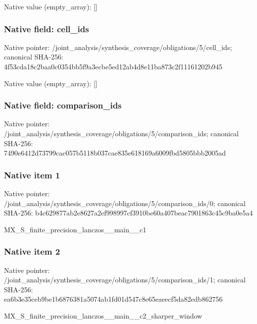 \documentclass[10pt,a4paper]{article}
\begin{document}
Native value (empty\_\allowbreak{}array): []

\subsubsection{Native field: cell\_\allowbreak{}ids}
Native pointer: /joint\_\allowbreak{}analysis/synthesis\_\allowbreak{}coverage/obligations/5/cell\_\allowbreak{}ids; canonical SHA-256: 4f53cda18c2baa0c0354bb5f9a3ecbe5ed12ab4d8e11ba873c2f11161202b945

Native value (empty\_\allowbreak{}array): []

\subsubsection{Native field: comparison\_\allowbreak{}ids}
Native pointer: /joint\_\allowbreak{}analysis/synthesis\_\allowbreak{}coverage/obligations/5/comparison\_\allowbreak{}ids; canonical SHA-256: 7490e6412d73799cac057b5118b037cae835e618169a6009fbd5805bbb2005ad

\subsubsection{Native item 1}
Native pointer: /joint\_\allowbreak{}analysis/synthesis\_\allowbreak{}coverage/obligations/5/comparison\_\allowbreak{}ids/0; canonical SHA-256: b4c629877ab2e8627a2ef998997cf3910be60a407beac7901863c45c9ba0e5a4

\begingroup\raggedright\sloppy MX\_\allowbreak{}S\_\allowbreak{}finite\_\allowbreak{}precision\_\allowbreak{}lanczos\_\allowbreak{}\_\allowbreak{}main\_\allowbreak{}\_\allowbreak{}c1\par\endgroup

\subsubsection{Native item 2}
Native pointer: /joint\_\allowbreak{}analysis/synthesis\_\allowbreak{}coverage/obligations/5/comparison\_\allowbreak{}ids/1; canonical SHA-256: ea6b3e35ceb9be1b6876381a5074ab1fd01d547c8e65eaeecf5da82edb862756

\begingroup\raggedright\sloppy MX\_\allowbreak{}S\_\allowbreak{}finite\_\allowbreak{}precision\_\allowbreak{}lanczos\_\allowbreak{}\_\allowbreak{}main\_\allowbreak{}\_\allowbreak{}c2\_\allowbreak{}sharper\_\allowbreak{}window\par\endgroup
\end{document}
